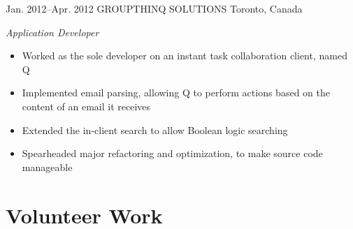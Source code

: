 \documentclass[]{friggeri-cv} %
\begin{document}
\begin{entrylist}
\entry
{Jan. 2012--Apr. 2012}
{GROUPTHINQ SOLUTIONS}
{Toronto, Canada}
{\emph{Application Developer} \\
\begin{itemize}
	\item Worked as the sole developer on an instant task collaboration client, named Q
	\item Implemented email parsing, allowing Q to perform actions based on the content of an email it receives 	
	\item Extended the in-client search to allow Boolean logic searching
	\item Spearheaded major refactoring and optimization, to make source code manageable 
\end{itemize}
}
\end{entrylist}




\section{Volunteer Work}
\end{document}
